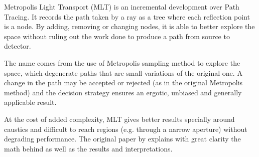Metropolis Light Transport (MLT) is an incremental development over Path
Tracing.
It records the path taken by a ray as a tree where each reflection point is a node. By
adding, removing or changing nodes, it is able to better explore the space
without ruling out the work done to produce a path from source to detector.

The name comes from the use of Metropolis sampling method to explore the space,
which degenerate paths that are small variations of the original one. A change
in the path may be accepted or rejected (as in the original Metropolis method)
and the decision strategy ensures an ergotic, unbiased and generally applicable
result.

At the cost of added complexity, MLT gives better results specially around
caustics and difficult to reach regions (e.g. through a narrow aperture)
without degrading performance. The original paper by \citet{veach1997metropolis}
explains with great clarity the math behind as well as the results and
interpretations.


% 
% 
% 
% 
% 
% 
% 
% 
% 
% 
% 
% 
% 
% 
% 
% 
